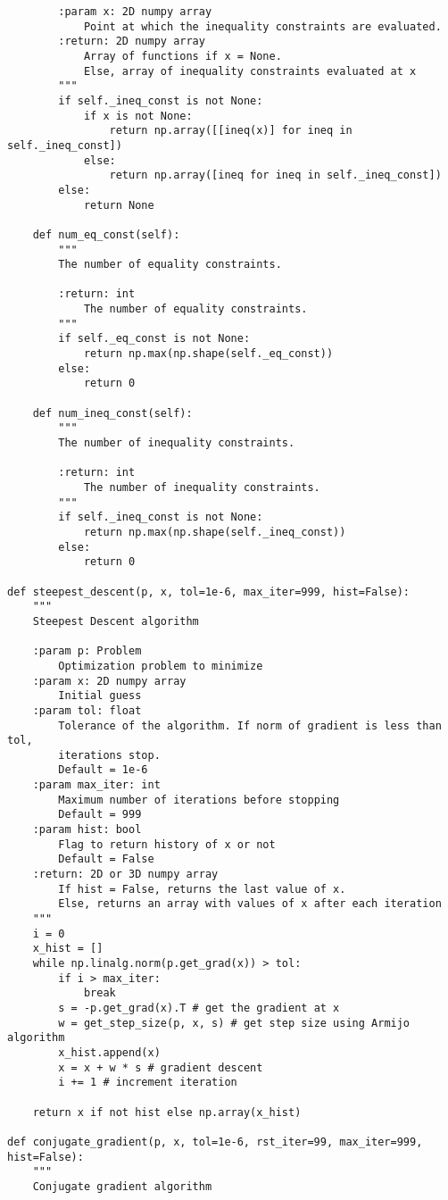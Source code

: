\begin{lstlisting}
        :param x: 2D numpy array
            Point at which the inequality constraints are evaluated.
        :return: 2D numpy array
            Array of functions if x = None.
            Else, array of inequality constraints evaluated at x
        """
        if self._ineq_const is not None:
            if x is not None:
                return np.array([[ineq(x)] for ineq in self._ineq_const])
            else:
                return np.array([ineq for ineq in self._ineq_const])
        else:
            return None

    def num_eq_const(self):
        """
        The number of equality constraints.

        :return: int
            The number of equality constraints.
        """
        if self._eq_const is not None:
            return np.max(np.shape(self._eq_const))
        else:
            return 0

    def num_ineq_const(self):
        """
        The number of inequality constraints.

        :return: int
            The number of inequality constraints.
        """
        if self._ineq_const is not None:
            return np.max(np.shape(self._ineq_const))
        else:
            return 0

def steepest_descent(p, x, tol=1e-6, max_iter=999, hist=False):
    """
    Steepest Descent algorithm

    :param p: Problem
        Optimization problem to minimize
    :param x: 2D numpy array
        Initial guess
    :param tol: float
        Tolerance of the algorithm. If norm of gradient is less than tol,
        iterations stop.
        Default = 1e-6
    :param max_iter: int
        Maximum number of iterations before stopping
        Default = 999
    :param hist: bool
        Flag to return history of x or not
        Default = False
    :return: 2D or 3D numpy array
        If hist = False, returns the last value of x.
        Else, returns an array with values of x after each iteration
    """
    i = 0
    x_hist = []
    while np.linalg.norm(p.get_grad(x)) > tol:
        if i > max_iter:
            break
        s = -p.get_grad(x).T # get the gradient at x
        w = get_step_size(p, x, s) # get step size using Armijo algorithm
        x_hist.append(x)
        x = x + w * s # gradient descent
        i += 1 # increment iteration

    return x if not hist else np.array(x_hist)

def conjugate_gradient(p, x, tol=1e-6, rst_iter=99, max_iter=999, hist=False):
    """
    Conjugate gradient algorithm


\end{lstlisting}
